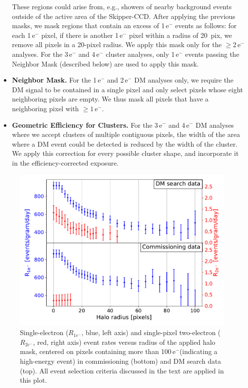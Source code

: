 \documentclass[aps,prl,twocolumn,showpacs,superscriptaddress,preprintnumbers]{revtex4-1}
\newcommand{\unit}[1]{\ensuremath{\mathrm{\,#1}}\xspace}
\newcommand{\e}{\unit{e^{-}}}
\newcommand{\Rs}{$R_{1e^-}$}
\newcommand{\Rtwo}{$R_{2e^-}$}
\begin{document}
\begin{itemize}[leftmargin=*]
These regions could arise from, e.g., showers of nearby background events outside of the active area of the Skipper-CCD. 
After applying the previous masks, we mask regions that contain an excess of 1\e events as follows: for each 1\e pixel, if there is another 1\e pixel within a radius of 20~pix, we remove all pixels in a 20-pixel radius. We apply this mask only for the $\ge$2\e analyses. For the 3\e and 4\e cluster analyses, only 1\e events passing the Neighbor Mask (described below) are used to apply this mask. 
%
\item{\bf Neighbor Mask.} For the 1\e and 2\e DM analyses only, we require the DM signal to be contained in a single pixel and only select pixels whose eight neighboring pixels are empty. We thus mask all pixels that have a neighboring pixel with $\ge1\e$.
%
\item{\bf Geometric Efficiency for Clusters.} For the 3\e and 4\e DM analyses where we accept clusters of multiple contiguous pixels, the width of the area where a DM event could be detected is reduced by the width of the cluster. We apply this correction for every possible cluster shape, and incorporate it in the efficiency-corrected exposure.
%
\end{itemize}%
\begin{figure}[t!]
\begin{center}
\includegraphics[width=0.99\textwidth]{Halomerge.pdf}
\caption{Single-electron (\Rs, blue, left axis) and single-pixel two-electron (\Rtwo, red, right axis) event rates versus radius of the applied halo mask, centered on pixels containing more than 100\e (indicating a high-energy event) in commissioning (bottom) and DM search data (top). All event selection criteria discussed in the text are applied in this plot.}
\label{fig:Halo}
\end{center}
\end{figure}
\end{document}
